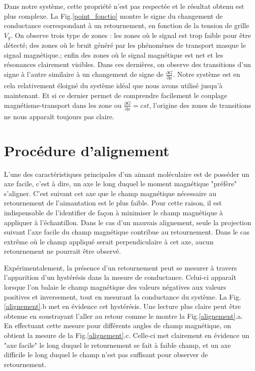 Dans notre système, cette propriété n'est pas respectée et le résultat obtenu est plus complexe. La Fig.\ref{point_fonctio} montre le signe du changement de conductance correspondant à un retournement, en fonction de la tension de grille $V_g$. On observe trois type de zones : les zones où le signal est trop faible pour être détecté; des zones où le bruit généré par les phénomènes de transport masque le signal magnétique.; enfin des zones où le signal magnétique est net et les résonances clairement visibles. Dans ces dernières, on observe des transitions d'un signe à l'autre similaire à un changement de signe de $\frac{\partial G}{\partial \mu}$. Notre système est en cela relativement éloigné du système idéal que nous avons utilisé jusqu'à maintenant. Et si ce dernier permet de comprendre facilement le couplage magnétisme-transport dans les zone ou $\frac{\partial G}{\partial \mu} = cst$, l'origine des zones de transitions ne nous apparaît toujours pas claire.

\section{Procédure d'alignement}
L'une des caractéristiques principales d'un aimant moléculaire est de posséder un axe facile, c'est à dire, un axe le long duquel le moment magnétique "préfère" s'aligner. C'est suivant cet axe que le champ magnétique nécessaire au retournement de l'aimantation est le plus faible. Pour cette raison, il est indispensable de l'identifier de façon à minimiser le champ magnétique à appliquer à l'échantillon. Dans le cas d'un mauvais alignement, seule la projection suivant l'axe facile du champ magnétique contribue au retournement. Dans le cas extrême où le champ appliqué serait perpendiculaire à cet axe, aucun retournement ne pourrait être observé.

Expérimentalement, la présence d'un retournement peut se mesurer à travers l'apparition d'un hystérésis dans la mesure de conductance. Celui-ci apparaît lorsque l'on balaie le champ magnétique des valeurs négatives aux valeurs positives et inversement, tout en mesurant la conductance du système. La Fig.\ref{alignement}.b met en évidence cet hystérésis. Une lecture plus claire peut être obtenue en soustrayant l'aller au retour comme le montre la Fig.\ref{alignement}.a. En effectuant cette mesure pour différents angles de champ magnétique, on obtient la mesure de la Fig.\ref{alignement}.c. Celle-ci met clairement en évidence un "axe facile" le long duquel le retournement se fait à faible champ, et un axe difficile le long duquel le champ n'est pas suffisant pour observer de retournement.

